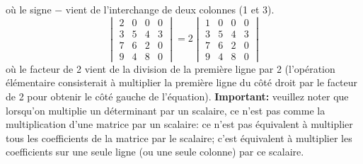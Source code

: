 où le signe $-$ vient de l'interchange de deux colonnes (1 et 3).
\[
\begin{vmatrix}
2& 0 & 0 & 0 \\
3& 5 & 4 & 3 \\
7& 6 & 2 & 0 \\
9& 4 & 8 & 0
\end{vmatrix}
= 2 
\begin{vmatrix}
1& 0 & 0 & 0 \\
3& 5 & 4 & 3 \\
7& 6 & 2 & 0 \\
9& 4 & 8 & 0
\end{vmatrix}
\]
où le facteur de 2 vient de la division de la première ligne par 2 (l'opération élémentaire consisterait
à multiplier la première ligne du côté droit par le facteur de 2 pour obtenir le côté gauche de l'équation).  
\textbf{Important:} veuillez noter que lorsqu'on multiplie un déterminant par un scalaire, 
ce n'est pas comme la multiplication d'une matrice par un scalaire: ce n'est pas équivalent
à multiplier tous les coefficients de la matrice par le scalaire; c'est équivalent à multiplier
les coefficients sur une seule ligne (ou une seule colonne) par ce scalaire.

